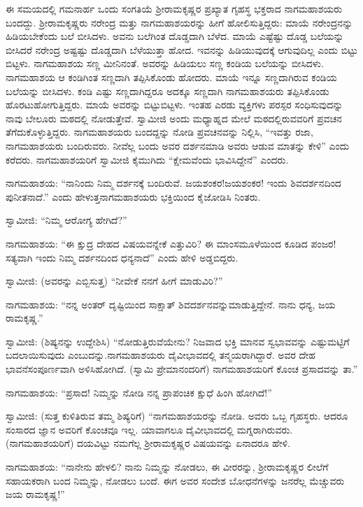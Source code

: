  ಈ ಸಮಯದಲ್ಲಿ ಗಮನಾರ್ಹ ಒಂದು ಸಂಗತಿಯೆ ಶ‍್ರೀರಾಮಕೃಷ್ಣರ ಪ್ರಖ್ಯಾತ ಗೃಹಸ್ಥ ಭಕ್ತರಾದ ನಾಗಮಹಾಶಯರು ಬಂದದ್ದು. ಶ‍್ರೀರಾಮಕೃಷ್ಣರು ನರೇಂದ್ರ ಮತ್ತು ನಾಗಮಹಾಶಯರನ್ನು ಹೀಗೆ ಹೋಲಿಸುತ್ತಿದ್ದರು: ಮಾಯೆ ನರೇಂದ್ರನನ್ನು ಹಿಡಿಯಬೇಕೆಂದು ಬಲೆ ಬೀಸಿದಳು. ಅವನು ಬಲೆಗಿಂತ ದೊಡ್ಡದಾಗಿ ಬೆಳೆದ. ಮಾಯೆ ಎಷ್ಟೆಷ್ಟು ದೊಡ್ಡ ಬಲೆಯನ್ನು ಬೀಸಿದರೆ ನರೇಂದ್ರ ಅಷ್ಟಷ್ಟು ದೊಡ್ಡದಾಗಿ ಬೆಳೆಯುತ್ತಾ ಹೋದ. ಇವನನ್ನು ಹಿಡಿಯುವುದಕ್ಕೆ ಆಗುವುದಿಲ್ಲ ಎಂದು ಬಿಟ್ಟು ಬಿಟ್ಟಳು. ನಾಗಮಹಾಶಯ ಸಣ್ಣ ಮೀನಿನಂತೆ. ಅವರನ್ನು ಹಿಡಿಯಲು ಸಣ್ಣ ಕಂಡಿಯ ಬಲೆಯನ್ನು ಬೀಸಿದಳು. ನಾಗಮಹಾಶಯ ಆ ಕಂಡಿಗಿಂತ ಸಣ್ಣದಾಗಿ ತಪ್ಪಿಸಿಕೊಂಡು ಹೋದರು. ಮಾಯೆ ಇನ್ನೂ ಸಣ್ಣದಾಗಿರುವ ಕಂಡಿಯ ಬಲೆಯನ್ನು ಬೀಸಿದಳು. ಕಂಡಿ ಎಷ್ಟು ಸಣ್ಣದಾಗಿದ್ದರೂ ಅದಕ್ಕೂ ಸಣ್ಣದಾಗಿ ನಾಗಮಹಾಶಯರು ತಪ್ಪಿಸಿಕೊಂಡು ಹೊರಟುಹೋಗುತ್ತಿದ್ದರು. ಮಾಯೆ ಅವರನ್ನು ಬಿಟ್ಟುಬಿಟ್ಟಳು. ಇಂತಹ ಎರಡು ವ್ಯಕ್ತಿಗಳು ಪರಸ್ಪರ ಸಂಧಿಸುವುದನ್ನು ನಾವು ಬೇಲೂರು ಮಠದಲ್ಲಿ ನೋಡುತ್ತೇವೆ. ಸ್ವಾಮೀಜಿ ಅಂದು ಮಧ್ಯಾಹ್ನದ ಮೇಲೆ ಮಠದಲ್ಲಿರುವವರಿಗೆ ಪ್ರವಚನ ತೆಗೆದುಕೊಳ್ಳುತ್ತಿದ್ದರು. ನಾಗಮಹಾಶಯರು ಬಂದದ್ದನ್ನು ನೋಡಿ ಪ್ರವಚನವನ್ನು ನಿಲ್ಲಿಸಿ, “ಇವತ್ತು ರಜಾ, ನಾಗಮಹಾಶಯರು ಬಂದಿರುವರು. ನೀವೆಲ್ಲ ಬಂದು ಅವರ ದರ್ಶನಮಾಡಿ ಅವರು ಆಡುವ ಮಾತನ್ನು ಕೇಳಿ” ಎಂದು ಕರೆದರು. ನಾಗಮಹಾಶಯರಿಗೆ ಸ್ವಾಮೀಜಿ ಕೈಮುಗಿದು “ಕ್ಷೇಮವೆಂದು ಭಾವಿಸಿದ್ದೇನೆ” ಎಂದರು. 

\newpage

 ನಾಗಮಹಾಶಯ: “ನಾನಿಂದು ನಿಮ್ಮ ದರ್ಶನಕ್ಕೆ ಬಂದಿರುವೆ. ಜಯಶಂಕರ!\break ಜಯಶಂಕರ! ಇಂದು ಶಿವದರ್ಶನದಿಂದ ಪುನೀತನಾದೆ.” ಎಂದು ಹೇಳುತ್ತ\break ನಾಗಮಹಾಶಯರು ಭಕ್ತಿಯಿಂದ ಕೈಜೋಡಿಸಿ ನಿಂತರು. 

 ಸ್ವಾಮೀಜಿ: “ನಿಮ್ಮ ಆರೋಗ್ಯ ಹೇಗಿದೆ?” 

 ನಾಗಮಹಾಶಯ: “ಈ ಕ್ಷುದ್ರ ದೇಹದ ವಿಷಯವನ್ನೇಕೆ ಎತ್ತುವಿರಿ? ಈ ಮಾಂಸಮೂಳೆಯಿಂದ ಕೂಡಿದ ಪಂಜರ! ಸತ್ಯವಾಗಿ ಇಂದು ನಿಮ್ಮ ದರ್ಶನದಿಂದ ಧನ್ಯನಾದೆ” ಎಂದು ಹೇಳಿ ಅಡ್ಡಬಿದ್ದರು. 

 ಸ್ವಾಮೀಜಿ: (ಅವರನ್ನು ಎಬ್ಬಿಸುತ್ತ) “ನೀವೇಕೆ ನನಗೆ ಹೀಗೆ ಮಾಡುವಿರಿ?” 

 ನಾಗಮಹಾಶಯ: “ನನ್ನ ಅಂತರ್ ದೃಷ್ಟಿಯಿಂದ ಸಾಕ್ಷಾತ್ ಶಿವದರ್ಶನವನ್ನು\break ಮಾಡುತ್ತಿದ್ದೇನೆ. ನಾನು ಧನ್ಯ, ಜಯ ರಾಮಕೃಷ್ಣ.” 

 ಸ್ವಾಮೀಜಿ: (ಶಿಷ್ಯನನ್ನು ಉದ್ದೇಶಿಸಿ) “ನೋಡುತ್ತಿರುವೆಯೇನು? ನಿಜವಾದ ಭಕ್ತಿ ಮಾನವ ಸ್ವಭಾವವನ್ನು ಎಷ್ಟುಮಟ್ಟಿಗೆ ಬದಲಾಯಿಸುವುದು ಎಂಬುದನ್ನು.\break ನಾಗಮಹಾಶಯರು ದೈವೀಭಾವದಲ್ಲಿ ತನ್ಮಯರಾಗಿದ್ದಾರೆ. ಅವರ ದೇಹ ಭಾವನೆ\break ಸಂಪೂರ್ಣವಾಗಿ ಅಳಿಸಿಹೋಗಿದೆ. (ಸ್ವಾಮಿ ಪ್ರೇಮಾನಂದರಿಗೆ) ನಾಗಮಹಾಶಯರಿಗೆ ಕೊಂಚ ಪ್ರಸಾದವನ್ನು ತಾ.” 

 ನಾಗಮಹಾಶಯ: “ಪ್ರಸಾದ! ನಿಮ್ಮನ್ನು ನೋಡಿ ನನ್ನ ಪ್ರಾಪಂಚಿಕ ಕ್ಷುಧೆ ಹಿಂಗಿ ಹೋಗಿದೆ!” 

 ಸ್ವಾಮೀಜಿ: (ಸುತ್ತ ಕುಳಿತಿರುವ ತಮ್ಮ ಶಿಷ್ಯರಿಗೆ) “ನಾಗಮಹಾಶಯರನ್ನು ನೋಡಿ. ಅವರು ಒಬ್ಬ ಗೃಹಸ್ಥರು. ಆದರೂ ಸಂಸಾರದ ಜ್ಞಾನ ಅವರಿಗೆ ಕೊಂಚವೂ ಇಲ್ಲ. ಯಾವಾಗಲೂ ದೈವೀಭಾವದಲ್ಲಿ ಮಗ್ನರಾಗಿರುವರು. (ನಾಗಮಹಾಶಯರಿಗೆ) ದಯವಿಟ್ಟು ನಮಗೆಲ್ಲ ಶ‍್ರೀರಾಮಕೃಷ್ಣರ ವಿಷಯವನ್ನು ಏನಾದರೂ ಹೇಳಿ. 

 ನಾಗಮಹಾಶಯ: “ನಾನೇನು ಹೇಳಲಿ? ನಾನು ನಿಮ್ಮನ್ನು ನೋಡಲು, ಈ ವೀರರನ್ನು, ಶ‍್ರೀರಾಮಕೃಷ್ಣರ ಲೀಲೆಗೆ ಸಹಾಯಕರಾಗಿ ಬಂದ ನಿಮ್ಮನ್ನು, ನೋಡಲು ಬಂದೆ. ಈಗ ಅವರ ಸಂದೇಶ ಬೋಧನೆಗಳನ್ನು ಜನರೆಲ್ಲ ಮೆಚ್ಚುವರು ಜಯ ರಾಮಕೃಷ್ಣ!” 

